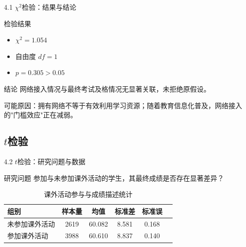 \documentclass{beamer}
\newenvironment{block*}
  {\setbeamercolor{block title}{bg=white,fg=white}%
   \begin{block}{}}
  {\end{block}}
\begin{document}
\begin{frame}{4.1 \(\chi^2\)检验：结果与结论}
    \begin{block}{检验结果}
        \begin{itemize}
            \item \(\chi^2 = 1.054\)
            \item 自由度 \(df = 1\)
            \item \(p= 0.305 > 0.05\)
        \end{itemize}
    \end{block}

    \vspace{0.5cm}

    \begin{alertblock}{结论}
        网络接入情况与最终考试及格情况无显著关联，未拒绝原假设。
    \end{alertblock}

    \vspace{0.3cm}

    \begin{block*}
        可能原因：拥有网络不等于有效利用学习资源；随着教育信息化普及，网络接入的"门槛效应"正在减弱。
    \end{block*}
\end{frame}

\subsection{\(t\)检验}
\begin{frame}{4.2 \(t\)检验：研究问题与数据}
    \begin{block}{研究问题}
        参加与未参加课外活动的学生，其最终成绩是否存在显著差异？
    \end{block}

    \vspace{0.3cm}

    \begin{table}
        \centering
        \renewcommand{\arraystretch}{1.3}
        \begin{tabular}{lccccc}
            \toprule
            组别 & 样本量 & 均值 & 标准差 & 标准误 \\
            \midrule
            未参加课外活动 & 2619 & 60.082 & 8.581 & 0.168 \\
            参加课外活动 & 3988 & 60.610 & 8.837 & 0.140 \\
            \bottomrule
        \end{tabular}
        \caption{课外活动参与与成绩描述统计}
    \end{table}
\end{frame}
\end{document}
